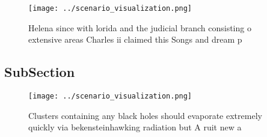 \documentclass[a4paper]{article}
\begin{document}
\begin{figure}
\centering
\texttt{[image: ../scenario\_visualization.png]}
\caption{Helena since with lorida and the judicial branch consisting o extensive areas Charles ii claimed this Songs and dream p
}
\end{figure}
 
\subsection{SubSection}

\begin{figure}
\centering
\texttt{[image: ../scenario\_visualization.png]}
\caption{Clusters containing any black holes should evaporate extremely quickly via bekensteinhawking radiation but A ruit new a
}
\end{figure}
 
\end{document}
